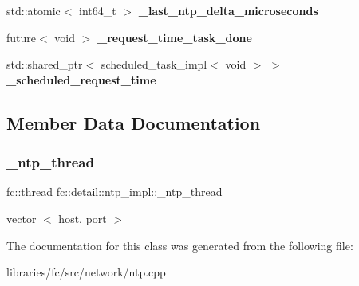 \begin{DoxyCompactItemize}
std\+::atomic$<$ int64\+\_\+t $>$ {\bfseries \+\_\+last\+\_\+ntp\+\_\+delta\+\_\+microseconds}
\item 
\mbox{\label{classfc_1_1detail_1_1ntp__impl_a2dfc9c9e2546e2674577e26be8cc98a5}} 
future$<$ void $>$ {\bfseries \+\_\+request\+\_\+time\+\_\+task\+\_\+done}
\item 
\mbox{\label{classfc_1_1detail_1_1ntp__impl_ae84a47c5d0b6670eec22cef7e3095f1c}} 
std\+::shared\+\_\+ptr$<$ scheduled\+\_\+task\+\_\+impl$<$ void $>$ $>$ {\bfseries \+\_\+scheduled\+\_\+request\+\_\+time}
\end{DoxyCompactItemize}


\subsection{Member Data Documentation}
\mbox{\label{classfc_1_1detail_1_1ntp__impl_ad6bd75c34d45ab832c5bf5ab7aab0cca}} 
\subsubsection{\texorpdfstring{\+\_\+ntp\+\_\+thread}{\_ntp\_thread}}
{\footnotesize\ttfamily fc\+::thread fc\+::detail\+::ntp\+\_\+impl\+::\+\_\+ntp\+\_\+thread}

vector $<$ host, port $>$ 

The documentation for this class was generated from the following file\+:\begin{DoxyCompactItemize}
\item 
libraries/fc/src/network/ntp.\+cpp\end{DoxyCompactItemize}
